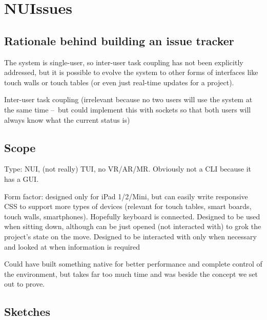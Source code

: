 \section{NUIssues}

\subsection{Rationale behind building an issue tracker}

The system is single-user, so inter-user task coupling has not been explicitly addressed, but it is possible to evolve the system to other forms of interfaces like touch walls or touch tables (or even just real-time updates for a project).

Inter-user task coupling (irrelevant because no two users will use the system at the same time – but could implement this with sockets so that both users will always know what the current status is)

\subsection{Scope}

Type: NUI, (not really) TUI, no VR/AR/MR. Obviously not a CLI because it has a GUI.

Form factor: designed only for iPad 1/2/Mini, but can easily write responsive CSS to support more types of devices (relevant for touch tables, smart boards, touch walls, smartphones). Hopefully keyboard is connected. Designed to be used when sitting down, although can be just opened (not interacted with) to grok the project's state on the move. Designed to be interacted with only when necessary and looked at when information is required

Could have built something native for better performance and complete control of the environment, but takes far too much time and was beside the concept we set out to prove.

\subsection{Sketches}


